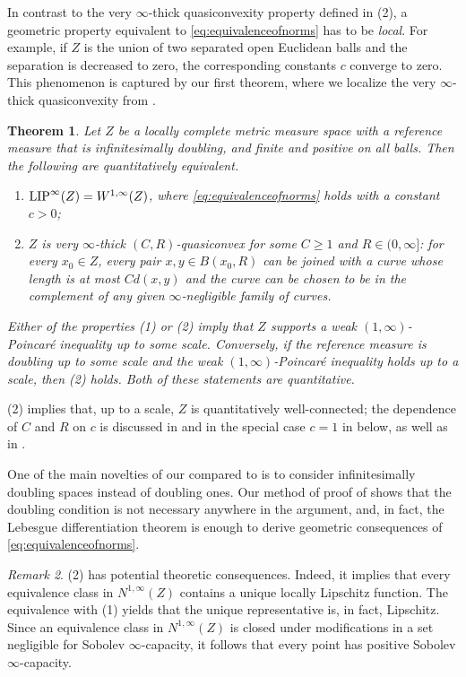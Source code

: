 \documentclass[reqno]{amsart}
\newcommand{\LIP}{{\rm LIP}}
\numberwithin{equation}{section}
\newtheorem{theorem}{Theorem}[section]
\theoremstyle{remark}
\newtheorem{remark}[theorem]{Remark}
\begin{document}
In contrast to the very $\infty$-thick quasiconvexity property defined in  (2), a geometric property equivalent to \eqref{eq:equivalenceofnorms} has to be \emph{local}. For example, if $Z$ is the union of two separated open Euclidean balls and the separation is decreased to zero, the corresponding constants $c$ converge to zero. This phenomenon is captured by our first theorem,  where we localize the very $\infty$-thick quasiconvexity from \cite{D-CJS2016}.
\begin{theorem}\label{thm:equivalence}
Let $Z$ be a locally complete metric measure space with a reference measure that is infinitesimally doubling, and finite and positive on all balls. Then the following are quantitatively equivalent.
\begin{enumerate}
    \item $\LIP^{\infty}(Z) = W^{1,\infty}(Z)$, where  \eqref{eq:equivalenceofnorms} holds with a constant $c > 0$;
    \item $Z$ is very $\infty$-thick $(C,R)$-quasiconvex for some $C \geq 1$ and $R \in (0,\infty]$: for every $x_0 \in Z$, every pair $x,y \in B( x_0, R )$ can be joined with a curve whose length is at most $C d(x,y)$ and the curve can be chosen to be in the complement of any given $\infty$-negligible family of curves.
\end{enumerate}
Either of the properties (1) or (2) imply that $Z$ supports a weak $(1,\infty)$-Poincaré inequality up to some scale. Conversely, if the reference measure is doubling up to some scale and the weak $(1,\infty)$-Poincaré inequality holds up to a scale, then (2) holds. Both of these statements are quantitative.
\end{theorem}
 (2) implies that, up to a scale, $Z$ is quantitatively well-connected; the dependence of $C$ and $R$ on $c$ is discussed in  and in the special case $c = 1$ in   below, as well as in .

One of the main novelties of our  compared to  is to consider infinitesimally doubling spaces instead of doubling ones. Our method of proof of  shows that the doubling condition is not necessary anywhere in the argument, and, in fact, the Lebesgue differentiation theorem is enough to derive geometric consequences of \eqref{eq:equivalenceofnorms}.


\begin{remark}\label{rem:potential:consequences}
 (2) has potential theoretic consequences. Indeed, it implies that every equivalence class in $N^{1,\infty}(Z)$ contains a unique locally Lipschitz function. The equivalence with  (1) yields that the unique representative is, in fact, Lipschitz. Since an equivalence class in $N^{1,\infty}(Z)$ is closed under modifications in a set negligible for Sobolev $\infty$-capacity, it follows that every point has positive Sobolev $\infty$-capacity.
\end{remark}
\end{document}
